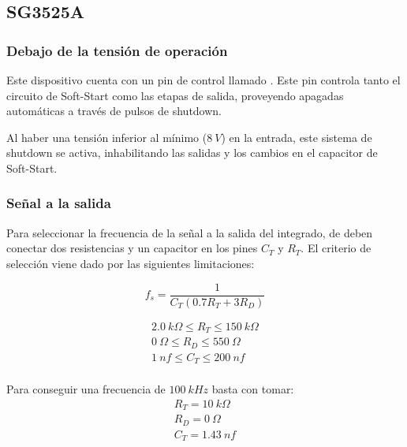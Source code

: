 %
%
%

\subsection{SG3525A}

\subsubsection{Debajo de la tensión de operación}

Este dispositivo cuenta con un pin de control llamado . Este pin controla tanto el circuito de Soft-Start como las etapas de salida, proveyendo apagadas automáticas a través de pulsos de shutdown.

Al haber una tensión inferior al mínimo ($8 \ V$) en la entrada, este sistema de shutdown se activa, inhabilitando las salidas y los cambios en el capacitor de Soft-Start.

\subsubsection{Señal a la salida}

Para seleccionar la frecuencia de la señal a la salida del integrado, de deben conectar dos resistencias y un capacitor en los pines $C_T$ y $R_T$. El criterio de selección viene dado por las siguientes limitaciones:

\begin{equation}
	f_s = \frac{1}{C_T \left( 0.7 R_T + 3 R_D \right)}
\end{equation}

\begin{equation*}
\begin{gathered}
2.0 \ k\Omega \leqslant R_T \leqslant 150 \ k\Omega \\
0 \ \Omega \leqslant R_D \leqslant 550 \ \Omega \\
1 \ nf \leqslant C_T \leqslant 200 \ nf \\
\end{gathered}
\end{equation*}

Para conseguir una frecuencia de $100 \ kHz$ basta con tomar:
\begin{equation}
\begin{gathered}
R_T = 10 \ k\Omega \\
R_D = 0 \ \Omega \\
C_T = 1.43 \ nf \\
\end{gathered}
\end{equation}

